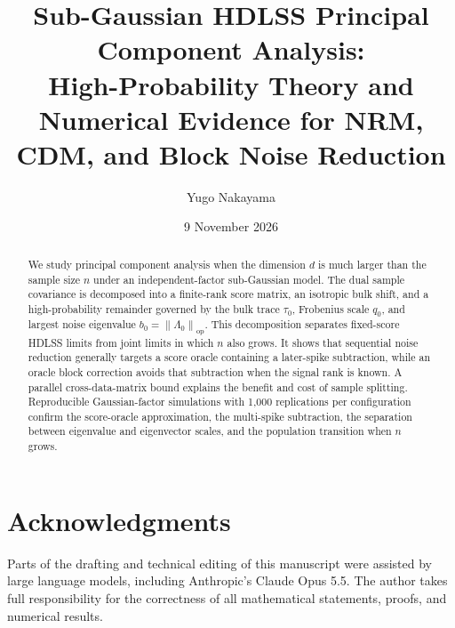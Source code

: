 \documentclass[11pt,a4paper]{amsart}
\author@andify\authors
\title[Sub-Gaussian HDLSS PCA]{Sub-Gaussian HDLSS Principal Component Analysis:\\
High-Probability Theory and Numerical Evidence for NRM, CDM, and Block Noise Reduction}
\author{Yugo Nakayama}
\date{9 November 2026}
\numberwithin{equation}{section}
\theoremstyle{definition}
\theoremstyle{remark}
\newcommand{\op}{\mathrm{op}}
\newcommand{\norm}[1]{\left\lVert#1\right\rVert}
\begin{document}
\begin{abstract}
We study principal component analysis when the dimension $d$ is much larger than the sample size $n$ under an independent-factor sub-Gaussian model.  The dual sample covariance is decomposed into a finite-rank score matrix, an isotropic bulk shift, and a high-probability remainder governed by the bulk trace $\tau_0$, Frobenius scale $q_0$, and largest noise eigenvalue $b_0=\norm{\Lambda_0}_{\op}$.  This decomposition separates fixed-score HDLSS limits from joint limits in which $n$ also grows.  It shows that sequential noise reduction generally targets a score oracle containing a later-spike subtraction, while an oracle block correction avoids that subtraction when the signal rank is known.  A parallel cross-data-matrix bound explains the benefit and cost of sample splitting.  Reproducible Gaussian-factor simulations with 1,000 replications per configuration confirm the score-oracle approximation, the multi-spike subtraction, the separation between eigenvalue and eigenvector scales, and the population transition when $n$ grows.
\end{abstract}
\maketitle














\section*{Acknowledgments}
Parts of the drafting and technical editing of this manuscript were assisted by large language models, including Anthropic’s Claude Opus 5.5. The author takes full responsibility for the correctness of all mathematical statements, proofs, and numerical results.



\end{document}
